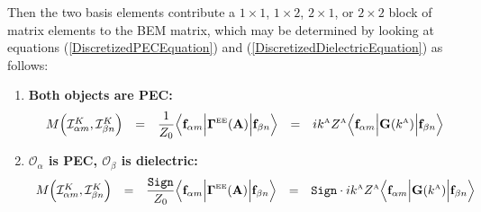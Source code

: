 \documentclass[dvips,letterpaper]{article}
\newcommand{\BG}{\boldsymbol{\Gamma}}
\begin{document}
Then the two basis elements contribute a 
$1\times 1$, $1\times 2$, $2\times 1$, or $2\times 2$
block of matrix elements to the BEM matrix, which may be determined
by looking at equations 
(\ref{DiscretizedPECEquation}) 
and 
(\ref{DiscretizedDielectricEquation}) 
as follows:
\begin{enumerate}
\item \textbf{Both objects are PEC:}
$$\begin{array}{lclcl}
   M\Big( \mathcal{I}^K_{\alpha m}, \mathcal{I}^K_{\beta n} \Big) 
  &=&
  \displaystyle{ \frac{1}{Z_0} 
                 \Big\langle 
                 \vb f_{\alpha m} 
                 \Big| \BG\supt{EE}(\vb A) \Big|
                 \vb f_{\beta n} 
                 \Big\rangle
               }
  &=&
  \displaystyle{
  ik\supt{A} Z\supt{A}
                \Big\langle 
                \vb f_{\alpha m} 
                \Big| \vb G(k\supt{A}) \Big|
                \vb f_{\beta n} 
                \Big\rangle
               }
\end{array}$$
\item \textbf{ $\mathcal{O}_\alpha$ is PEC, 
               $\mathcal{O}_\beta$ is dielectric:}
$$\begin{array}{lclcl}
 M\Big( \mathcal{I}^K_{\alpha m}, \mathcal{I}^K_{\beta n} \Big) 
  &=& 
  \displaystyle{ \frac{\texttt{Sign}}{Z_0} 
                 \Big\langle \vb f_{\alpha m} 
                 \Big| \BG\supt{EE}(\vb A) \Big|
                 \vb f_{\beta n} 
                 \Big\rangle
               }
  &=&
  \displaystyle{ \texttt{Sign}\cdot ik\supt{A} Z\supt{A}
                 \Big\langle \vb f_{\alpha m} 
                 \Big| \vb G(k\supt{A}) \Big|
                 \vb f_{\beta n} 
                 \Big\rangle
               }
\\[10pt]

\end{array}$$
\end{enumerate}
\end{document}
